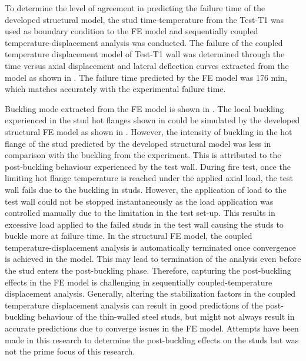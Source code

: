 To determine the level of agreement in predicting the failure time of the developed structural model, the stud time-temperature from the Test-T1 was used as boundary condition to the FE model and sequentially coupled temperature-displacement analysis was conducted. The failure of the coupled temperature displacement model of Test-T1 wall was determined through the time versus axial displacement and lateral deflection curves extracted from the model as shown in . The failure time predicted by the FE model was 176 min, which matches accurately with the experimental failure time. 

Buckling mode extracted from the FE model is shown in . The local buckling experienced in the stud hot flanges shown in  could be simulated by the developed structural FE model as shown in . However, the intensity of buckling in the hot flange of the stud predicted by the developed structural model was less in comparison with the buckling from the experiment. This is attributed to the post-buckling behaviour experienced by the test wall. During fire test, once the limiting hot flange temperature is reached under the applied axial load, the test wall fails due to the buckling in studs. However, the application of load to the test wall could not be stopped instantaneously as the load application was controlled manually due to the limitation in the test set-up. This results in excessive load applied to the failed studs in the test wall causing the studs to buckle more at failure time. In the structural FE model, the coupled temperature-displacement analysis is automatically terminated once convergence is achieved in the model. This may lead to termination of the analysis even before the stud enters the post-buckling phase. Therefore, capturing the post-buckling effects in the FE model is challenging in sequentially coupled-temperature displacement analysis. Generally, altering the stabilization factors in the coupled temperature displacement analysis can result in good predictions of the post-buckling behaviour of the thin-walled steel studs, but might not always result in accurate predictions due to converge issues in the FE model. Attempts have been made in this research to determine the post-buckling effects on the studs but was not the prime focus of this research. 

